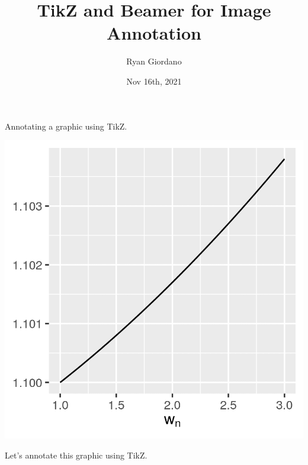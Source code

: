 \documentclass[8pt]{beamer}\usepackage[]{graphicx}\usepackage[]{color}
\title{TikZ and Beamer for Image Annotation}
\author{Ryan Giordano}
\date{Nov 16th, 2021}
\institute{Massachusetts Institute of Technology}
\begin{document}

\begin{frame}[fragile]{Annotating a graphic using TikZ.}

\begin{center}
\begin{minipage}{0.38\textwidth}
\includegraphics[width=\textwidth]{e_beta_w}
\end{minipage}
\end{center}

\hrulefill

Let's annotate this graphic using TikZ.


\end{frame}
\end{document}
